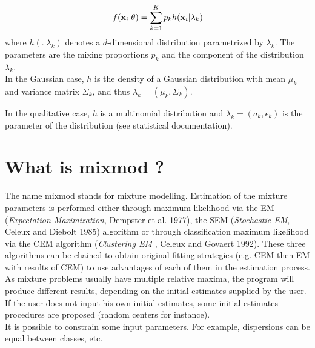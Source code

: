 \begin{eqnarray}
  f({\bf x}_i|\theta) = \sum_{k=1}^{K}p_kh({\bf x}_i|\lambda_k)
 \label{mixpdf}
\end{eqnarray}
where $h(.|{\lambda}_k)$ denotes a $d$-dimensional distribution parametrized by $\lambda_k$.
The parameters are the mixing proportions $p_k$ and the component of the distribution $\lambda_k$.\\

In the Gaussian case, $h$ is the density of a Gaussian distribution with mean $\mu_k$
and variance matrix $\Sigma_k$, and thus $\lambda_k = (\mu_k,\Sigma_k)$.

In the qualitative case, $h$ is a multinomial distribution and $\lambda_k=(a_k,\epsilon_k)$ is the
parameter of the distribution (see statistical documentation).


\section{What is {\sc mixmod} ?}

The name {\sc mixmod} stands for {\sc mix}ture {\sc mod}elling. Estimation
of the mixture parameters is performed either through maximum
likelihood via the EM ({\em Expectation Maximization}, Dempster et
al. 1977), the SEM ({\em Stochastic EM}, Celeux and Diebolt 1985)
algorithm or through classification maximum likelihood via the CEM
algorithm ({\em Clustering EM }, Celeux and Govaert 1992). These three
algorithms can be chained to obtain original fitting strategies
(e.g. CEM then EM with results of CEM) to use advantages of each of
them in the estimation process. As mixture problems usually have
multiple relative maxima, the program will produce different results,
depending on the initial estimates supplied by the user. If the user
does not input his own initial estimates, some initial estimates
procedures are proposed (random centers for instance).\\

It is possible to constrain some input parameters. For example, dispersions can be equal between classes, etc.\\

